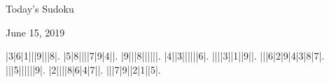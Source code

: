 \documentclass{article}
\begin{document}
\begin{center}
\Huge{Today's Sudoku}
\end{center}
\begin{center}
\Large{June 15, 2019}
\end{center}
\begin{sudoku}
|3|6|1|||9|||8|.
|5|8||||7|9|4||.
|9|||8||||||.
|4||3||||||6|.
||||3||1||9||.
|||6|2|9|4|3|8|7|.
|||5||||||9|.
|2||||8|6|4|7||.
|||7|9||2|1||5|.
\end{sudoku}
\end{document}
